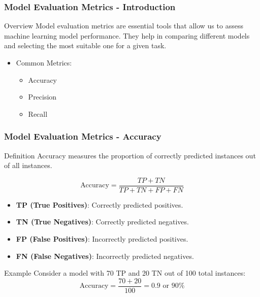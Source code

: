 \documentclass[aspectratio=169]{beamer}
\begin{document}
\begin{frame}[fragile]
    \frametitle{Model Evaluation Metrics - Introduction}
    \begin{block}{Overview}
        Model evaluation metrics are essential tools that allow us to assess machine learning model performance. 
        They help in comparing different models and selecting the most suitable one for a given task.
    \end{block}
    \begin{itemize}
        \item Common Metrics: 
        \begin{itemize}
            \item Accuracy
            \item Precision
            \item Recall
        \end{itemize}
    \end{itemize}
\end{frame}

\begin{frame}[fragile]
    \frametitle{Model Evaluation Metrics - Accuracy}
    \begin{block}{Definition}
        Accuracy measures the proportion of correctly predicted instances out of all instances.
    \end{block}
    
    \begin{equation}
        \text{Accuracy} = \frac{TP + TN}{TP + TN + FP + FN}
    \end{equation}

    \begin{itemize}
        \item \textbf{TP (True Positives)}: Correctly predicted positives.
        \item \textbf{TN (True Negatives)}: Correctly predicted negatives.
        \item \textbf{FP (False Positives)}: Incorrectly predicted positives.
        \item \textbf{FN (False Negatives)}: Incorrectly predicted negatives.
    \end{itemize}

    \begin{block}{Example}
        Consider a model with 70 TP and 20 TN out of 100 total instances:
        \[
        \text{Accuracy} = \frac{70 + 20}{100} = 0.9 \text{ or } 90\%
        \]
    \end{block}
\end{frame}
\end{document}
